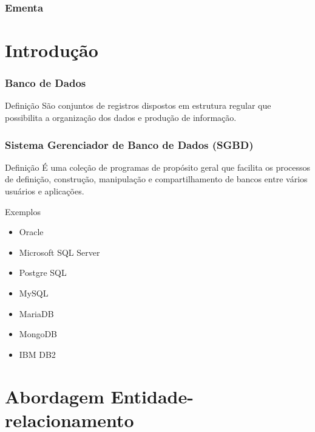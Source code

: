 \documentclass{beamer}
\begin{document}
\begin{frame}
	\frametitle{Ementa}
  	\tableofcontents
\end{frame}


\section{Introdução}

\begin{frame}
\frametitle{Banco de Dados}

\begin{block}{Definição}
	São conjuntos de registros dispostos em estrutura regular que possibilita a
	organização dos dados e produção de informação.
\end{block}
\end{frame}

\begin{frame}
\frametitle{Sistema Gerenciador de Banco de Dados (SGBD)}

\begin{block}{Definição}
É uma coleção de programas de propósito geral que facilita os processos de
definição, construção, manipulação e compartilhamento de bancos entre
vários usuários e aplicações.
\end{block} \vfill

\begin{exampleblock}{Exemplos}
\begin{itemize}
\item Oracle
\item Microsoft SQL Server
\item Postgre SQL
\item MySQL
\item MariaDB
\item MongoDB
\item IBM DB2
\end{itemize}
\end{exampleblock}

\end{frame}

\section{Abordagem Entidade-relacionamento}
\end{document}

